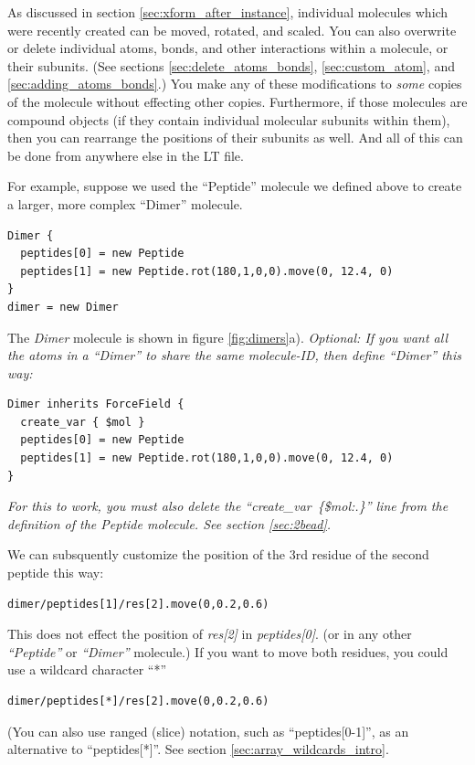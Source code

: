 \documentclass[11pt]{article}
\begin{document}
As discussed in section \ref{sec:xform_after_instance},
individual molecules which were recently created
can be moved, rotated, and scaled.
You can also overwrite or delete individual atoms, 
bonds, and other interactions within a molecule, or their subunits.
(See sections 
\ref{sec:delete_atoms_bonds}, 
\ref{sec:custom_atom}, and \ref{sec:adding_atoms_bonds}.)
You make any of these modifications to \textit{some} copies 
of the molecule without effecting other copies.
Furthermore, if those molecules are compound objects 
(if they contain individual molecular subunits within them),
then you can rearrange the positions of their subunits as well.
And all of this can be done from anywhere else in the LT file.

For example, suppose we used the ``Peptide'' molecule we defined above
to create a larger, more complex ``Dimer'' molecule.
\begin{verbatim}
Dimer {
  peptides[0] = new Peptide
  peptides[1] = new Peptide.rot(180,1,0,0).move(0, 12.4, 0)
}
dimer = new Dimer
\end{verbatim}
The \textit{Dimer} molecule is shown in figure \ref{fig:dimers}a). 
\textit{Optional: If you want all the atoms in a ``Dimer'' to share the same molecule-ID,
then define ``Dimer'' this way:}
\begin{verbatim}
Dimer inherits ForceField {
  create_var { $mol }
  peptides[0] = new Peptide
  peptides[1] = new Peptide.rot(180,1,0,0).move(0, 12.4, 0)
}
\end{verbatim}
\textit{For this to work, you must also delete the 
 \mbox{\textit{``create\_var \{\$mol:.\}''}} line from
 the definition of the Peptide molecule. See section \ref{sec:2bead}.}


We can subsquently customize the position of the 3rd residue 
of the second peptide this way:
\begin{verbatim}
dimer/peptides[1]/res[2].move(0,0.2,0.6)
\end{verbatim}

This does not effect the position of \textit{res[2]} in \textit{peptides[0]}.
(or in any other \textit{``Peptide''} or \textit{``Dimer''} molecule.)
If you want to move both residues, you could use a wildcard character ``*''
\begin{verbatim}
dimer/peptides[*]/res[2].move(0,0.2,0.6)
\end{verbatim}
(You can also use ranged (slice) notation, such as ``peptides[0-1]'',
 as an alternative to ``peptides[*]''. 
See section \ref{sec:array_wildcards_intro}.
\end{document}

